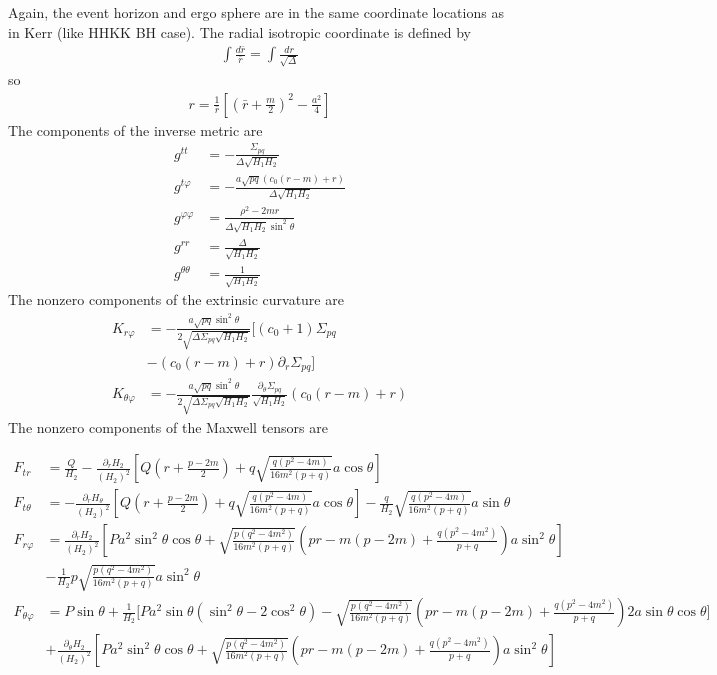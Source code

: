 \documentclass[%
 reprint,
 amsmath,amssymb,
 aps,
]{revtex4-1}
\begin{document}
Again, the event horizon and ergo sphere are in the same coordinate locations as in Kerr (like HHKK BH case). The radial isotropic coordinate is defined by
\begin{align}
\int \frac{d \bar{r}}{\bar{r}} = \int \frac{dr}{\sqrt{\Delta}}
\end{align}
so
\begin{align}
r = \frac{1}{\bar{r}} \left[ \left(\bar{r} + \frac{m}{2} \right)^2 - \frac{a^2}{4} \right]
\end{align}
The components of the inverse metric are
\begin{align}
g^{tt} &= -\frac{\Sigma_{pq}}{\Delta \sqrt{H_1 H_2}} \\
g^{t \varphi} &= - \frac{a \sqrt{pq} (c_0 (r-m) + r)}{\Delta \sqrt{H_1 H_2}} \\
g^{\varphi \varphi} &= \frac{\rho^2 - 2mr}{\Delta \sqrt{H_1 H_2} \sin^2 \theta} \\
g^{rr} &= \frac{\Delta}{\sqrt{H_1 H_2}} \\
g^{\theta \theta} &= \frac{1}{\sqrt{H_1 H_2}}
\end{align}
The nonzero components of the extrinsic curvature are
\begin{align}
K_{r \varphi} &= -\frac{a \sqrt{pq} \sin^2 \theta}{2 \sqrt{ \Delta \Sigma_{pq} \sqrt{H_1 H_2}}} [(c_0 +1) \Sigma_{pq} \nonumber\\
& - (c_0 (r-m) +r) \partial_r \Sigma_{pq} ]\\
K_{\theta \varphi} &= -\frac{a \sqrt{pq} \sin^2 \theta}{2 \sqrt{ \Delta \Sigma_{pq} \sqrt{H_1 H_2}}} \frac{\partial_\theta \Sigma_{pq}}{\sqrt{H_1 H_2}} (c_0 (r-m) +r) 
\end{align}
The nonzero components of the Maxwell tensors are
\begin{widetext}
\begin{align}
F_{tr} &= \frac{Q}{H_2} - \frac{\partial_r H_2}{(H_2)^2} \left[ Q \left(r+\frac{p-2m}{2} \right) + q \sqrt{\frac{q(p^2-4m)}{16m^2(p+q)}} a \cos \theta \right] \\
F_{t \theta} &= - \frac{\partial_r H_\theta}{(H_2)^2} \left[ Q \left(r+\frac{p-2m}{2} \right) + q \sqrt{\frac{q(p^2-4m)}{16m^2(p+q)}} a \cos \theta \right] 
- \frac{q}{H_2} \sqrt{\frac{q(p^2-4m)}{16m^2(p+q)}} a \sin \theta\\
F_{r \varphi} &= \frac{\partial_r H_2}{(H_2)^2} \left[P a^2 \sin^2 \theta \cos \theta + \sqrt{\frac{p(q^2-4m^2)}{16m^2(p+q)}} \left(pr - m (p-2m) +\frac{q(p^2-4m^2)}{p+q} \right) a \sin^2 \theta \right] \nonumber \\
		    &-\frac{1}{H_2} p \sqrt{\frac{p(q^2-4m^2)}{16m^2(p+q)}} a \sin^2 \theta\\
F_{\theta \varphi} &= P \sin \theta + \frac{1}{H_2} \Bigg[P a^2 \sin \theta (\sin^2 \theta - 2 \cos^2 \theta) 
			- \sqrt{\frac{p(q^2-4m^2)}{16m^2(p+q)}} \left(pr - m (p-2m) +\frac{q(p^2-4m^2)}{p+q} \right) 2a \sin \theta \cos \theta \Bigg] \nonumber \\
			&+\frac{\partial_\theta H_2}{(H_2)^2} \left[P a^2 \sin^2 \theta \cos \theta + \sqrt{\frac{p(q^2-4m^2)}{16m^2(p+q)}} \left(pr - m (p-2m) +\frac{q(p^2-4m^2)}{p+q} \right) a \sin^2 \theta \right]
\end{align}
\end{widetext}
\end{document}
